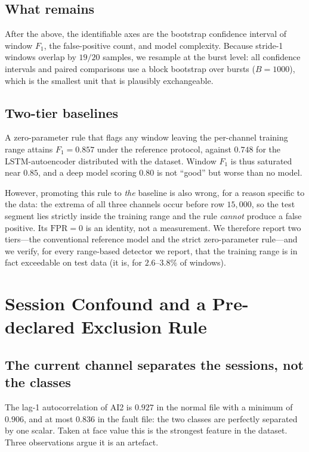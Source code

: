 \documentclass[twocolumn,10pt]{article}
\begin{document}
\subsection{What remains}

After the above, the identifiable axes are the bootstrap confidence interval of
window $F_1$, the false-positive count, and model complexity. Because stride-1
windows overlap by $19/20$ samples, we resample at the burst level: all
confidence intervals and paired comparisons use a block bootstrap over bursts
($B=1000$), which is the smallest unit that is plausibly exchangeable.

\subsection{Two-tier baselines}

A zero-parameter rule that flags any window leaving the per-channel training
range attains $F_1 = 0.857$ under the reference protocol, against $0.748$ for
the LSTM-autoencoder \citep{malhotra2016lstm} distributed with the dataset.
Window $F_1$ is thus saturated near $0.85$, and a deep model scoring $0.80$ is
not ``good'' but worse than no model.

However, promoting this rule to \emph{the} baseline is also wrong, for a reason
specific to the data: the extrema of all three channels occur before row
$15{,}000$, so the test segment lies strictly inside the training range and the
rule \emph{cannot} produce a false positive. Its $\text{FPR}=0$ is an identity,
not a measurement. We therefore report two tiers---the conventional reference
model and the strict zero-parameter rule---and we verify, for every range-based
detector we report, that the training range is in fact exceedable on test data
(it is, for $2.6$--$3.8\%$ of windows).

\section{Session Confound and a Pre-declared Exclusion Rule}
\label{sec:confound}

\subsection{The current channel separates the sessions, not the classes}

The lag-1 autocorrelation of \textsf{AI2} is $0.927$ in the normal file with a
minimum of $0.906$, and at most $0.836$ in the fault file: the two classes are
perfectly separated by one scalar. Taken at face value this is the strongest
feature in the dataset. Three observations argue it is an artefact.
\end{document}

